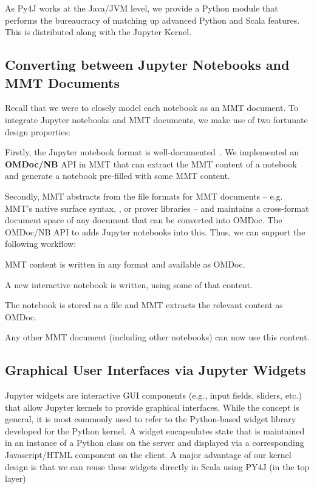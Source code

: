 As Py4J works at the Java/JVM level, we provide a Python module that performs the bureaucracy of matching up advanced Python and Scala features.
This is distributed along with the Jupyter Kernel. 

\subsection{Converting between Jupyter Notebooks and MMT Documents}\label{sec:kernel:mapping}

Recall that we were to closely model each notebook as an MMT document. 
To integrate Jupyter notebooks and MMT documents, we make use of two fortunate design properties:

Firstly, the Jupyter notebook format is well-documented~\cite{nbformat:on}. 
We implemented an \textbf{OMDoc/NB} API in MMT that can extract the MMT content of a notebook and generate a notebook pre-filled with some MMT content.

Secondly, MMT abstracts from the file formats for MMT documents -- e.g. MMT's native surface syntax, \sTeX, or prover libraries -- and  maintains a cross-format document space  of any document that can be converted into OMDoc.
The OMDoc/NB API to adds Jupyter notebooks into this.
Thus, we can support the following workflow:
\begin{compactenum}
 \item MMT content is written in any format and available as OMDoc.
 \item A new interactive notebook is written, using some of that content.
 \item The notebook is stored as a file and MMT extracts the relevant content as OMDoc.
 \item Any other MMT document (including other notebooks) can now use this content.
\end{compactenum}

\subsection{Graphical User Interfaces via Jupyter Widgets}\label{sec:kernel:widgets}

Jupyter widgets are interactive GUI components (e.g., input fields, sliders, etc.) that allow Jupyter kernels to provide graphical interfaces.
While the concept is general, it is most commonly used to refer to the Python-based widget library developed for the Python kernel.
A widget encapsulates state that is maintained in an instance of a Python class on the server and displayed via a corresponding Javascript/HTML component on the client.
A major advantage of our kernel design is that we can reuse these widgets directly in Scala using PY4J (in the top layer)

